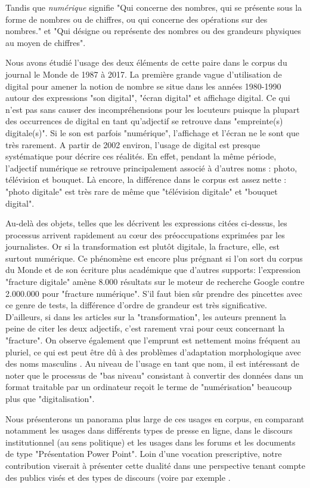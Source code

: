 Tandis que \textit{numérique} signifie "Qui concerne des nombres, qui se présente sous la forme de nombres ou de chiffres, ou qui concerne des opérations sur des nombres." et "Qui désigne ou représente des nombres ou des grandeurs physiques au moyen de chiffres".%

 Nous avons étudié l'usage des deux éléments de cette paire dans le corpus du journal le Monde de 1987 à 2017.
 La première grande vague d'utilisation de digital pour amener la notion de nombre se situe dans les années 1980-1990 autour des expressions "son digital", "écran digital" et affichage digital. Ce qui n'est pas sans causer des incompréhensions pour les locuteurs puisque la plupart des occurrences de digital en tant qu'adjectif se retrouve dans "empreinte(s) digitale(s)".
 Si le son est parfois "numérique", l'affichage et l'écran ne le sont que très rarement. A partir de 2002 environ, l'usage de digital est presque systématique pour décrire ces réalités.
 En effet, pendant la même période, l'adjectif numérique se retrouve principalement associé à d'autres noms : photo, télévision et bouquet.
Là encore, la différence dans le corpus est assez nette : "photo digitale" est très rare de même que "télévision digitale" et "bouquet digital".
 
 Au-delà des objets, telles que les décrivent les expressions citées ci-dessus, les processus arrivent rapidement au cœur des préoccupations exprimées par les journalistes. Or si la transformation est plutôt digitale, la fracture, elle, est surtout numérique. Ce phénomène est encore plus prégnant si l'on sort du corpus du Monde et de son écriture plus académique que d'autres supports: l'expression "fracture digitale" amène 8.000 résultats sur le moteur de recherche Google contre 2.000.000 pour "fracture numérique". S'il faut bien sûr prendre des pincettes avec ce genre de tests, la différence d'ordre de grandeur est très significative. D'ailleurs, si dans les articles sur la "transformation", les auteurs prennent la peine de citer les deux adjectifs, c'est rarement vrai pour ceux concernant la "fracture".
On observe également que l'emprunt est nettement moins fréquent au pluriel, ce qui est peut être dû à des problèmes d'adaptation morphologique avec des noms masculins \cite{Anas-2011}.
Au niveau de l'usage en tant que nom, il est intéressant de noter que le processus de "bas niveau" consistant à convertir des données dans un format traitable par un ordinateur reçoit le terme de "numérisation" beaucoup plus que "digitalisation".

Nous présenterons un panorama plus large de ces usages en corpus, en comparant notamment les usages dans différents types de presse en ligne, dans le discours institutionnel (au sens politique) et les usages dans les forums et les documents de type "Présentation Power Point". Loin d'une vocation prescriptive, notre contribution viserait à présenter cette dualité dans une perspective tenant compte des publics visés et des types de discours (voire par exemple \cite{Salvador-2017}.



